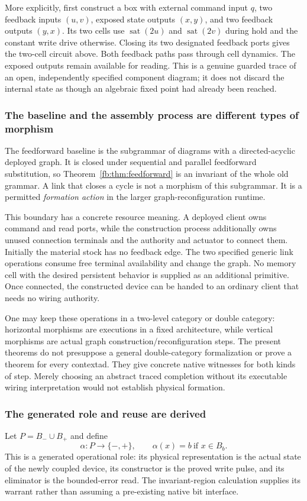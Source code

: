 \documentclass[11pt]{article}
\theoremstyle{definition}
\theoremstyle{remark}
\newcommand{\sat}{\operatorname{sat}}
\begin{document}
More explicitly, first construct a box with external command input $q$, two feedback inputs $(u,v)$, exposed state outputs $(x,y)$, and two feedback outputs $(y,x)$. Its two cells use $\sat(2u)$ and $\sat(2v)$ during hold and the constant write drive otherwise. Closing its two designated feedback ports gives the two-cell circuit above. Both feedback paths pass through cell dynamics. The exposed outputs remain available for reading. This is a genuine guarded trace of an open, independently specified component diagram; it does not discard the internal state as though an algebraic fixed point had already been reached.

\subsubsection{The baseline and the assembly process are different types of morphism}
The feedforward baseline is the subgrammar of diagrams with a directed-acyclic deployed graph. It is closed under sequential and parallel feedforward substitution, so Theorem~\ref{fb:thm:feedforward} is an invariant of the whole old grammar. A link that closes a cycle is not a morphism of this subgrammar. It is a permitted \emph{formation action} in the larger graph-reconfiguration runtime.

This boundary has a concrete resource meaning. A deployed client owns command and read ports, while the construction process additionally owns unused connection terminals and the authority and actuator to connect them. Initially the material stock has no feedback edge. The two specified generic link operations consume free terminal availability and change the graph. No memory cell with the desired persistent behavior is supplied as an additional primitive. Once connected, the constructed device can be handed to an ordinary client that needs no wiring authority.

One may keep these operations in a two-level category or double category: horizontal morphisms are executions in a fixed architecture, while vertical morphisms are actual graph construction/reconfiguration steps. The present theorems do not presuppose a general double-category formalization or prove a theorem for every contextad. They give concrete native witnesses for both kinds of step. Merely choosing an abstract traced completion without its executable wiring interpretation would not establish physical formation.

\subsubsection{The generated role and reuse are derived}
Let $P=B_-\cup B_+$ and define
\[
 \alpha:P\longrightarrow\{-,+\},\qquad
 \alpha(x)=b\ \text{if }x\in B_b.
\]
This is a generated operational role: its physical representation is the actual state of the newly coupled device, its constructor is the proved write pulse, and its eliminator is the bounded-error read. The invariant-region calculation supplies its warrant rather than assuming a pre-existing native bit interface.
\end{document}
